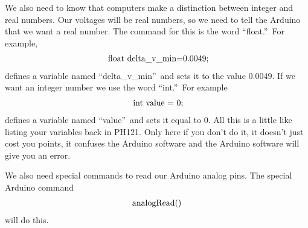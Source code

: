 We also need to know that computers make a distinction between integer and
real numbers. Our voltages will be real numbers, so we need to tell the
Arduino that we want a real number. The command for this is the word
\textquotedblleft float.\textquotedblright\ For example,%
\begin{equation*}
\begin{tabular}{l}
\ float\ delta\_v\_min=0.0049;%
\end{tabular}%
\end{equation*}%
defines a variable named \textquotedblleft delta\_v\_min\textquotedblright\
and sets it to the value $0.0049.$ If we want an integer number we use the
word \textquotedblleft int.\textquotedblright\ For example%
\begin{equation*}
\begin{tabular}{l}
\ int\ value\ =\ 0;%
\end{tabular}%
\end{equation*}%
defines a variable named \textquotedblleft value\textquotedblright\ and sets
it equal to $0.$ All this is a little like listing your variables back in
PH121. Only here if you don't do it, it doesn't just cost you points, it
confuses the Arduino software and the Arduino software will give you an
error.

We also need special commands to read our Arduino analog pins. The special
Arduino command 
\begin{equation*}
\begin{tabular}{l}
analogRead()%
\end{tabular}%
\end{equation*}%
will do this.

